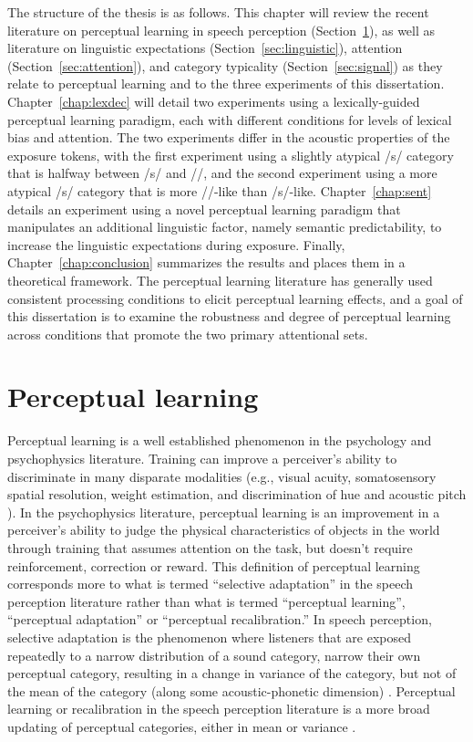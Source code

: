 The structure of the thesis is as follows.
This chapter will review the recent literature on perceptual learning in speech perception (Section~\ref{sec:perceptuallearning}), as well as literature on linguistic expectations (Section~\ref{sec:linguistic}), attention (Section~\ref{sec:attention}), and category typicality (Section~\ref{sec:signal}) as they relate to perceptual learning and to the three experiments of this dissertation.
Chapter~\ref{chap:lexdec} will detail two experiments using a lexically-guided perceptual learning paradigm, each with different conditions for levels of lexical bias and attention.  
The two experiments differ in the acoustic properties of the exposure tokens, with the first experiment using a slightly atypical /s/ category that is halfway between /s/ and /\textesh/, and the second experiment using a more atypical /s/ category that is more /\textesh/-like than /s/-like.  
Chapter~\ref{chap:sent} details an experiment using a novel perceptual learning paradigm that manipulates an additional linguistic factor, namely semantic predictability, to increase the linguistic expectations during exposure.
Finally, Chapter~\ref{chap:conclusion} summarizes the results and places them in a theoretical framework.
The perceptual learning literature has generally used consistent processing conditions to elicit perceptual learning effects, and a goal of this dissertation is to examine the robustness and degree of perceptual learning across conditions that promote the two primary attentional sets.

\section{Perceptual learning}
\label{sec:perceptuallearning}

Perceptual learning is a well established phenomenon in the psychology and psychophysics literature. 
Training can improve a perceiver's ability to discriminate in many disparate modalities (e.g., visual acuity, somatosensory spatial resolution, weight estimation, and discrimination of hue and acoustic pitch \citep[for review]{Gibson1953}). 
In the psychophysics literature, perceptual learning is an improvement in a perceiver's ability to judge the physical characteristics of objects in the world through training that assumes attention on the task, but doesn't require reinforcement, correction or reward.
This definition of perceptual learning corresponds more to what is termed ``selective adaptation'' in the speech perception literature rather than what is termed ``perceptual learning'', ``perceptual adaptation'' or ``perceptual recalibration.''  
In speech perception, selective adaptation is the phenomenon where listeners that are exposed repeatedly to a narrow distribution of a sound category, narrow their own perceptual category, resulting in a change in variance of the category, but not of the mean of the category (along some acoustic-phonetic dimension) \citep{Eimas1973,Samuel1986,Vroomen2007}.
Perceptual learning or recalibration in the speech perception literature is a more broad updating of perceptual categories, either in mean or variance \citep{Norris2003, Vroomen2007}.

